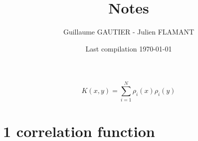 \documentclass{article}
\begin{document}

\title{Notes
}

\author{Guillaume GAUTIER - Julien FLAMANT}



\date{
   Last compilation \today
      }

\maketitle
{}

\begin{equation}
    K(x,y) = \sum_{i=1}^N \rho_i(x) \rho_i(y)
\end{equation}

\section{1 correlation function} %
\label{sec:1_correlation_function}
\end{document}
